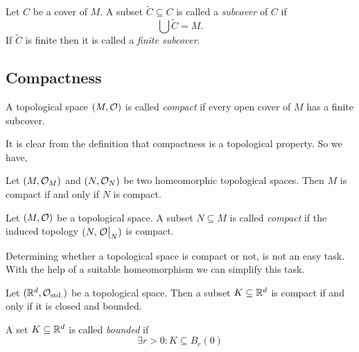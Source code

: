 \begin{definition}\label{def:subcover}
	Let \(C\) be a cover of \(M\). A subset \(\tilde{C} \subseteq C\) is called a \emph{subcover} of \(C\) if
	\begin{equation}
		\bigcup \tilde{C} = M. \label{eq:subcover}
	\end{equation}
	If \(\tilde{C}\) is finite then it is called a \emph{finite subcover}.
\end{definition}

\subsection{Compactness}
\begin{definition}\label{def:compact_space}
	A topological space \((M, \mathcal{O})\) is called \emph{compact} if every open cover of \(M\) has a finite subcover.
\end{definition}

It is clear from the definition that compactness is a topological property. So we have,
\begin{remark}
	Let \((M, \mathcal{O}_M)\) and \((N, \mathcal{O}_N)\) be two homeomorphic topological spaces. Then \(M\) is compact if and only if \(N\) is compact.
\end{remark}

\begin{definition}\label{def:compact_subset}
	Let \((M, \mathcal{O})\) be a topological space. A subset \(N \subseteq M\) is called \emph{compact} if the induced topology \((N, \eval{\O}_N)\) is compact.
\end{definition}

Determining whether a topological space is compact or not, is not an easy task. With the help of a suitable homeomorphism we can simplify this task.

\begin{theorem}\label{thm:heine_borel}
	Let \((\mathbb R^d, \mathcal{O}_{\text{std.}})\) be a topological space. Then a subset \(K \subseteq \mathbb R^d\) is compact if and only if it is closed and bounded.
\end{theorem}

\begin{remark}
	A set \(K \subseteq \mathbb R^d\) is called \emph{bounded} if
	\begin{equation}
		\exists r > 0: K \subseteq B_r(0) \label{eq:bounded_set}
	\end{equation}
\end{remark}

